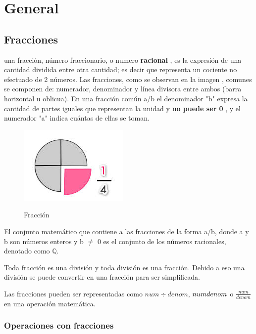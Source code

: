 \documentclass[12pt]{article}
\begin{document}
\section{General}



\subsection{Fracciones}

una fracción, número fraccionario, o numero \textbf{racional} ,
es la expresión de una cantidad dividida entre otra cantidad;
es decir que representa un cociente no efectuado de 2 números.
Las fracciones, como se observan en la imagen , comunes se componen de:
numerador, denominador y línea divisora
entre ambos (barra horizontal u oblicua). En una fracción común  a/b el
denominador "b" expresa la cantidad de partes iguales que
representan la unidad y \textbf{no puede ser 0} , y el numerador "a" indica
cuántas de ellas se toman.

    \begin{figure}[htb]
		\centering
        \caption{Fracción}
		\includegraphics{../images/fraccion.jpeg}
		\label{Fracción}
	\end{figure}


El conjunto matemático que contiene a las fracciones de la forma a/b, donde a y
b son números enteros y b $\not =$ 0 es el conjunto de los números racionales, denotado
como $\mathbb{Q}$.

Toda fracción es una división y toda división es una fracción. Debido a eso una
división se puede convertir en una fracción para ser simplificada.

Las fracciones pueden ser representadas como $num\div denom$, $num\/denom$ o
$\frac{num}{denom}$  en una operación matemática.



\subsubsection{Operaciones con fracciones}
\end{document}
